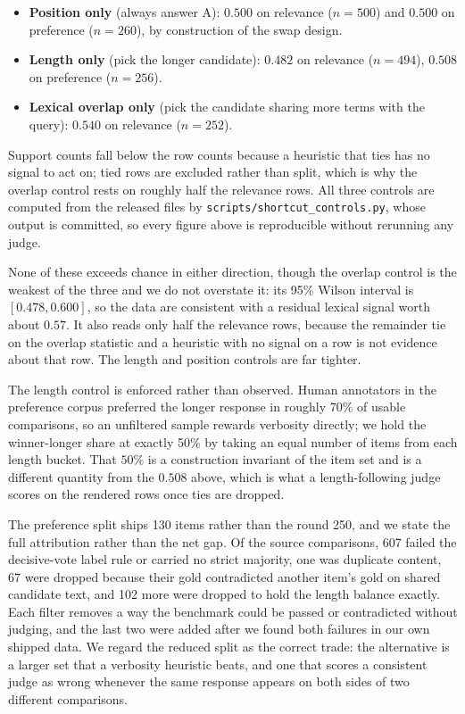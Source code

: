 \documentclass[11pt]{article}          %
\begin{document}
\begin{itemize}
  \item \textbf{Position only} (always answer A): $0.500$ on relevance
    ($n=500$) and $0.500$ on preference ($n=260$), by construction of the swap
    design.
  \item \textbf{Length only} (pick the longer candidate): $0.482$ on relevance
    ($n=494$), $0.508$ on preference ($n=256$).
  \item \textbf{Lexical overlap only} (pick the candidate sharing more terms with
    the query): $0.540$ on relevance ($n=252$).
\end{itemize}

Support counts fall below the row counts because a heuristic that ties has no
signal to act on; tied rows are excluded rather than split, which is why the
overlap control rests on roughly half the relevance rows. All three controls are
computed from the released files by \texttt{scripts/shortcut\_controls.py}, whose
output is committed, so every figure above is reproducible without rerunning any
judge.

None of these exceeds chance in either direction, though the overlap control is
the weakest of the three and we do not overstate it: its 95\% Wilson interval is
$[0.478, 0.600]$, so the data are consistent with a residual lexical signal worth
about $0.57$. It also reads only half the relevance rows, because the remainder
tie on the overlap statistic and a heuristic with no signal on a row is not
evidence about that row. The length and position controls are far tighter.

The length control is enforced rather than observed. Human annotators in the
preference corpus preferred the longer response in roughly 70\% of usable
comparisons, so an unfiltered sample rewards verbosity directly; we hold the
winner-longer share at exactly 50\% by taking an equal number of items from each
length bucket. That $50\%$ is a construction invariant of the item set and is a
different quantity from the $0.508$ above, which is what a length-following judge
scores on the rendered rows once ties are dropped.

The preference split ships 130 items rather than the round 250, and we state the
full attribution rather than the net gap. Of the source comparisons, 607 failed
the decisive-vote label rule or carried no strict majority, one was duplicate
content, 67 were dropped because their gold contradicted another item's gold on
shared candidate text, and 102 more were dropped to hold the length balance
exactly. Each filter removes a way the benchmark could be passed or contradicted
without judging, and the last two were added after we found both failures in our
own shipped data. We regard the reduced split as the correct trade: the
alternative is a larger set that a verbosity heuristic beats, and one that scores
a consistent judge as wrong whenever the same response appears on both sides of
two different comparisons.
\end{document}
